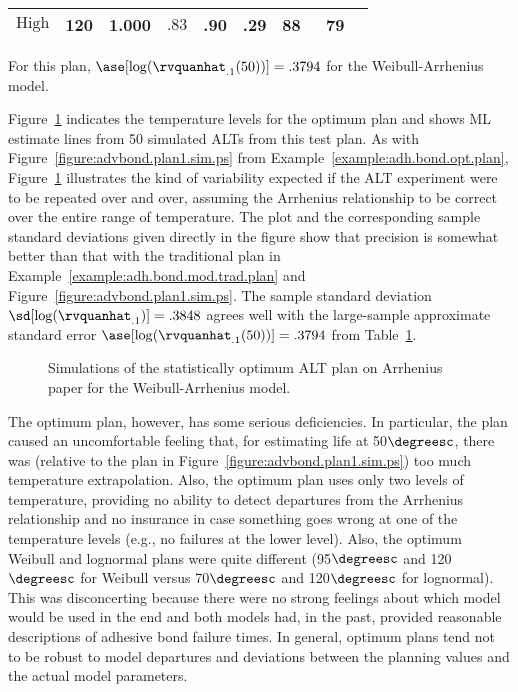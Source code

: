\begin{example}
\begin{table}
\begin{tabular}{ccrrccccc}
$\mbox{High}$ &\mbox{120}&1.000&$.83  $ & .90     & .29 &  88 & \mbox{ 79} \\
\hline
\end{tabular}
\begin{minipage}[t]{4in}
For this plan, $\ase[\log(\rvquanhat_{.1}(50))]=.3794$ for the 
Weibull-Arrhenius  model.
\end{minipage}
\label{table:alt.plan.opt.plan}
\end{table}
Figure~\ref{figure:advbond.plan2.sim.ps} indicates the temperature
levels for the optimum plan and shows ML estimate lines from 50
simulated ALTs from this test plan.  As with
Figure~\ref{figure:advbond.plan1.sim.ps} from
Example~\ref{example:adh.bond.opt.plan},
Figure~\ref{figure:advbond.plan2.sim.ps} illustrates the kind of
variability expected if the ALT experiment were to be repeated over
and over, assuming the Arrhenius relationship to be correct over the
entire range of temperature. The plot and the corresponding sample
standard deviations given directly in the figure show that precision
is somewhat better than that with the traditional plan in
Example~\ref{example:adh.bond.mod.trad.plan} and
Figure~\ref{figure:advbond.plan1.sim.ps}. The sample standard
deviation $\sd[\log(\rvquanhat_{.1})]=.3848$ agrees well with the
large-sample approximate standard error
$\ase[\log(\rvquanhat_{.1}(50))]= .3794 $ from
Table~\ref{table:alt.plan.opt.plan}.
\begin{figure}
\caption{Simulations of the
statistically optimum ALT plan on Arrhenius paper
for the Weibull-Arrhenius model.}
\label{figure:advbond.plan2.sim.ps}
\end{figure}

The optimum plan, however, has some serious deficiencies. In
particular, the plan caused an uncomfortable feeling 
that, for estimating life at 50$\degreesc$, there was (relative to the
plan in Figure~\ref{figure:advbond.plan1.sim.ps}) too
much temperature extrapolation.  Also, the optimum plan uses only two
levels of temperature, providing no ability to detect departures from
the Arrhenius relationship and no insurance in case something goes
wrong at one of the temperature levels (e.g., no failures at the lower
level).  Also, the optimum Weibull and lognormal plans were quite
different (95$\degreesc$ and 120$\degreesc$ for Weibull versus
70$\degreesc$ and 120$\degreesc$ for lognormal).  This was
disconcerting because there were no strong feelings about which model
would be used in the end and both models had, in the past, provided
reasonable descriptions of adhesive bond failure times.  In general,
optimum plans tend not to be robust to model departures and deviations
between the planning values and the actual model parameters.
\end{example}

